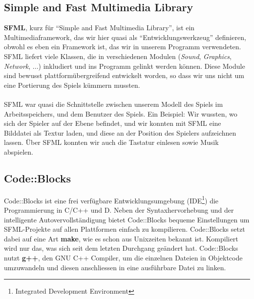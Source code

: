 \documentclass[12pt,a4paper]{scrartcl}
\newcommand{\q}[1]{``#1''}
\begin{document}
\subsection{Simple and Fast Multimedia Library}
\textbf{SFML}, kurz für \q{Simple and Fast Multimedia Library}, ist ein Multimediaframework, das wir hier quasi als
\q{Entwicklungswerkzeug} definieren, obwohl es eben ein Framework ist, das wir in unserem Programm verwendeten. SFML
liefert viele Klassen, die in verschiedenen Modulen (\textit{Sound}, \textit{Graphics}, \textit{Network}, ...) inkludiert
und ins Programm gelinkt werden können. Diese Module sind bewusst plattformübergreifend entwickelt worden, so dass wir uns
nicht um eine Portierung des Spiels kümmern mussten.
\\
\\
SFML war quasi die Schnittstelle zwischen unserem Modell des Spiels im Arbeitsspeichers, und dem Benutzer des Spiels. Ein Beispiel:
Wir wussten, wo sich der Spieler auf der Ebene befindet, und wir konnten mit SFML eine Bilddatei als Textur laden, und diese
an der Position des Spielers aufzeichnen lassen. Über SFML konnten wir auch die Tastatur einlesen sowie Musik abspielen.

\subsection{Code::Blocks}
Code::Blocks ist eine frei verfügbare Entwicklungsumgebung (IDE\footnote{Integrated Development Environment}) die Programmierung in C/C++ und D.
Neben der Syntaxhervorhebung und der intelligente Autovervollständigung bietet Code::Blocks bequeme Einstellungen um SFML-Projekte auf allen Plattformen
einfach zu kompilieren. Code::Blocks setzt dabei auf eine Art \textbf{make}, wie es schon aus Unixzeiten bekannt ist. Kompiliert wird nur das, was sich
seit dem letzten Durchgang geändert hat. Code::Blocks nutzt \textbf{g++}, den GNU C++ Compiler, um die einzelnen Dateien in Objektcode umzuwandeln und diesen
anschliessen in eine ausführbare Datei zu linken.
\end{document}
